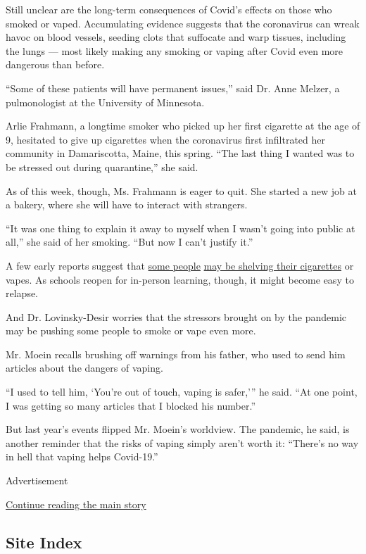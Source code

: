Still unclear are the long-term consequences of Covid's effects on those
who smoked or vaped. Accumulating evidence suggests that the coronavirus
can wreak havoc on blood vessels, seeding clots that suffocate and warp
tissues, including the lungs --- most likely making any smoking or
vaping after Covid even more dangerous than before.

``Some of these patients will have permanent issues,'' said Dr. Anne
Melzer, a pulmonologist at the University of Minnesota.

Arlie Frahmann, a longtime smoker who picked up her first cigarette at
the age of 9, hesitated to give up cigarettes when the coronavirus first
infiltrated her community in Damariscotta, Maine, this spring. ``The
last thing I wanted was to be stressed out during quarantine,'' she
said.

As of this week, though, Ms. Frahmann is eager to quit. She started a
new job at a bakery, where she will have to interact with strangers.

``It was one thing to explain it away to myself when I wasn't going into
public at all,'' she said of her smoking. ``But now I can't justify
it.''

A few early reports suggest that
\href{https://www.medrxiv.org/content/10.1101/2020.06.29.20142661v1}{some
people} \href{https://www.bbc.com/news/health-53403610}{may be shelving
their cigarettes} or vapes. As schools reopen for in-person learning,
though, it might become easy to relapse.

And Dr. Lovinsky-Desir worries that the stressors brought on by the
pandemic may be pushing some people to smoke or vape even more.

Mr. Moein recalls brushing off warnings from his father, who used to
send him articles about the dangers of vaping.

``I used to tell him, `You're out of touch, vaping is safer,''' he said.
``At one point, I was getting so many articles that I blocked his
number.''

But last year's events flipped Mr. Moein's worldview. The pandemic, he
said, is another reminder that the risks of vaping simply aren't worth
it: ``There's no way in hell that vaping helps Covid-19.''

Advertisement

\protect\hyperlink{after-bottom}{Continue reading the main story}

\hypertarget{site-index}{%
\subsection{Site Index}\label{site-index}}

